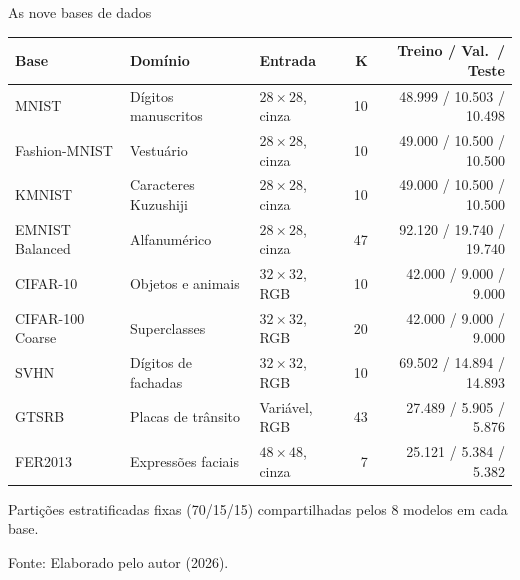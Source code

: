 \documentclass[aspectratio=169,11pt,brazil]{beamer}
\newcommand{\fonte}[1]{\par\vfill{\footnotesize\color{textmuted}Fonte: #1\par}}
\begin{document}
\begin{frame}{As nove bases de dados}
  \centering
  {\footnotesize
  \begin{tabular}{@{}lllrr@{}}
    \toprule
    \textbf{Base} & \textbf{Domínio} & \textbf{Entrada} & \textbf{K} & \textbf{Treino / Val.\ / Teste} \\
    \midrule
    MNIST & Dígitos manuscritos & $28\times 28$, cinza & 10 & 48.999 / 10.503 / 10.498 \\
    Fashion-MNIST & Vestuário & $28\times 28$, cinza & 10 & 49.000 / 10.500 / 10.500 \\
    KMNIST & Caracteres Kuzushiji & $28\times 28$, cinza & 10 & 49.000 / 10.500 / 10.500 \\
    EMNIST Balanced & Alfanumérico & $28\times 28$, cinza & 47 & 92.120 / 19.740 / 19.740 \\
    CIFAR-10 & Objetos e animais & $32\times 32$, RGB & 10 & 42.000 / 9.000 / 9.000 \\
    CIFAR-100 Coarse & Superclasses & $32\times 32$, RGB & 20 & 42.000 / 9.000 / 9.000 \\
    SVHN & Dígitos de fachadas & $32\times 32$, RGB & 10 & 69.502 / 14.894 / 14.893 \\
    GTSRB & Placas de trânsito & Variável, RGB & 43 & 27.489 / 5.905 / 5.876 \\
    FER2013 & Expressões faciais & $48\times 48$, cinza & 7 & 25.121 / 5.384 / 5.382 \\
    \bottomrule
  \end{tabular}}
  \vspace{0.15cm}
  {\footnotesize\color{textmuted}Partições estratificadas fixas (70/15/15) compartilhadas pelos 8 modelos em cada base.}
  \fonte{Elaborado pelo autor (2026).}
\end{frame}
\end{document}
